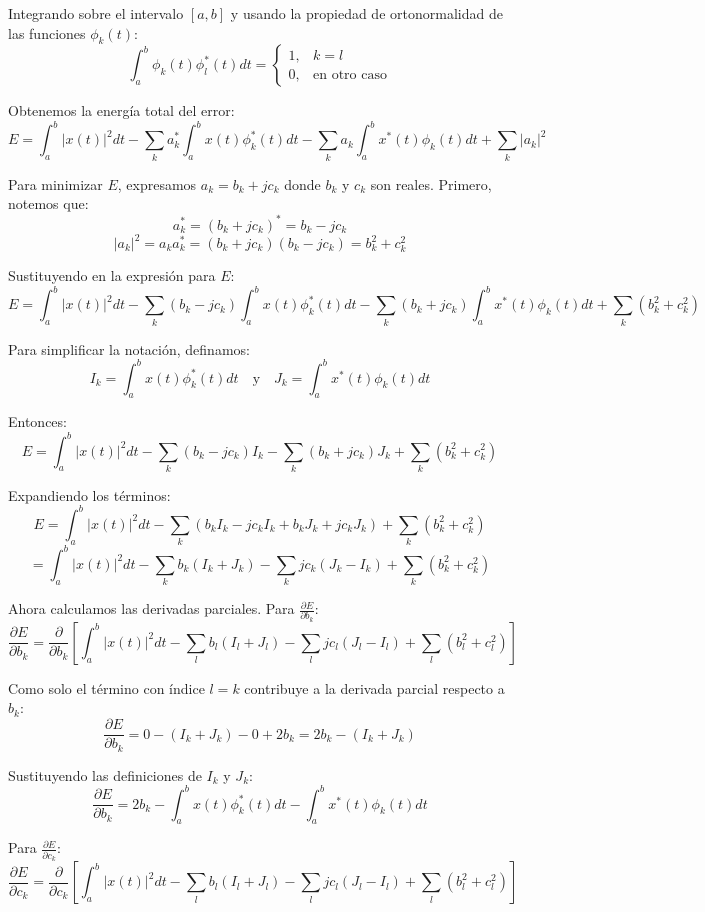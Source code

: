 \documentclass[
  11pt,
  letterpaper,
   addpoints,
   answers
  ]{exam}
\begin{document}
\begin{questions}
\begin{solution}
Integrando sobre el intervalo $[a,b]$ y usando la propiedad de ortonormalidad de las funciones $\phi_k(t)$:
$$\int_a^b \phi_k(t)\phi_l^*(t) dt = \begin{cases} 1, & k = l \\ 0, & \text{en otro caso} \end{cases}$$

Obtenemos la energía total del error:
$$E = \int_a^b |x(t)|^2 dt - \sum_k a_k^* \int_a^b x(t)\phi_k^*(t) dt - \sum_k a_k \int_a^b x^*(t)\phi_k(t) dt + \sum_k |a_k|^2$$

Para minimizar $E$, expresamos $a_k = b_k + jc_k$ donde $b_k$ y $c_k$ son reales. Primero, notemos que:
$$a_k^* = (b_k + jc_k)^* = b_k - jc_k$$
$$|a_k|^2 = a_k a_k^* = (b_k + jc_k)(b_k - jc_k) = b_k^2 + c_k^2$$

Sustituyendo en la expresión para $E$:
$$E = \int_a^b |x(t)|^2 dt - \sum_k (b_k - jc_k) \int_a^b x(t)\phi_k^*(t) dt - \sum_k (b_k + jc_k) \int_a^b x^*(t)\phi_k(t) dt + \sum_k (b_k^2 + c_k^2)$$

Para simplificar la notación, definamos:
$$I_k = \int_a^b x(t)\phi_k^*(t) dt \quad \text{y} \quad J_k = \int_a^b x^*(t)\phi_k(t) dt$$

Entonces:
$$E = \int_a^b |x(t)|^2 dt - \sum_k (b_k - jc_k)I_k - \sum_k (b_k + jc_k)J_k + \sum_k (b_k^2 + c_k^2)$$

Expandiendo los términos:
$$E = \int_a^b |x(t)|^2 dt - \sum_k (b_k I_k - jc_k I_k + b_k J_k + jc_k J_k) + \sum_k (b_k^2 + c_k^2)$$
$$= \int_a^b |x(t)|^2 dt - \sum_k b_k(I_k + J_k) - \sum_k jc_k(J_k - I_k) + \sum_k (b_k^2 + c_k^2)$$

Ahora calculamos las derivadas parciales. Para $\frac{\partial E}{\partial b_k}$:
$$\frac{\partial E}{\partial b_k} = \frac{\partial}{\partial b_k}\left[\int_a^b |x(t)|^2 dt - \sum_l b_l(I_l + J_l) - \sum_l jc_l(J_l - I_l) + \sum_l (b_l^2 + c_l^2)\right]$$

Como solo el término con índice $l = k$ contribuye a la derivada parcial respecto a $b_k$:
$$\frac{\partial E}{\partial b_k} = 0 - (I_k + J_k) - 0 + 2b_k = 2b_k - (I_k + J_k)$$

Sustituyendo las definiciones de $I_k$ y $J_k$:
$$\boxed{\frac{\partial E}{\partial b_k} = 2b_k - \int_a^b x(t)\phi_k^*(t) dt - \int_a^b x^*(t)\phi_k(t) dt}$$

Para $\frac{\partial E}{\partial c_k}$:
$$\frac{\partial E}{\partial c_k} = \frac{\partial}{\partial c_k}\left[\int_a^b |x(t)|^2 dt - \sum_l b_l(I_l + J_l) - \sum_l jc_l(J_l - I_l) + \sum_l (b_l^2 + c_l^2)\right]$$


\end{solution}
\end{questions}
\end{document}
